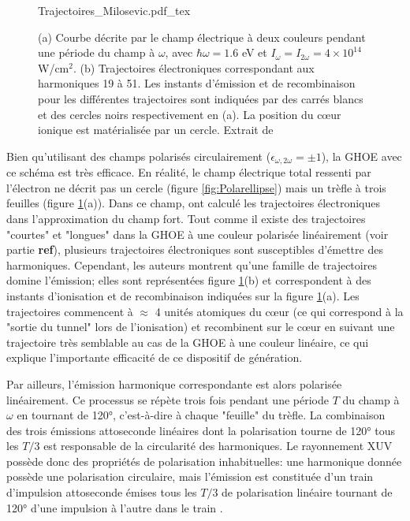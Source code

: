\begin{figure}[ht]
\centering
\def\svgwidth{\textwidth}
{Trajectoires_Milosevic.pdf_tex}
\caption{(a) Courbe décrite par le champ électrique à deux couleurs pendant une période du champ à $\omega$, avec $\hbar \omega = 1.6$ eV et $I_{\omega} = I_{2\omega} = 4 \times 10^{14}$ W/cm$^2$. (b) Trajectoires électroniques correspondant aux harmoniques 19 à 51. Les instants d'émission et de recombinaison pour les différentes trajectoires sont indiquées par des carrés blancs et des cercles noirs respectivement en (a). La position du c\oe ur ionique est matérialisée par un cercle. Extrait de }
\label{fig:Trajectoires_Milosevic}
\end{figure}

Bien qu'utilisant des champs polarisés circulairement ($\epsilon_{\omega, 2\omega} = \pm 1$), la GHOE avec ce schéma est très efficace. En réalité, le champ électrique total ressenti par l'électron ne décrit pas un cercle (figure \ref{fig:Polarellipse}) mais un trèfle à trois feuilles (figure \ref{fig:Trajectoires_Milosevic}(a)). Dans ce champ,  ont calculé les trajectoires électroniques dans l'approximation du champ fort. Tout comme il existe des trajectoires "courtes" et "longues" dans la GHOE à une couleur polarisée linéairement (voir partie \textbf{ref}), plusieurs trajectoires électroniques sont susceptibles d'émettre des harmoniques. Cependant, les auteurs montrent qu'une famille de trajectoires domine l'émission; elles sont représentées figure \ref{fig:Trajectoires_Milosevic}(b) et correspondent à des instants d'ionisation et de recombinaison indiquées sur la figure \ref{fig:Trajectoires_Milosevic}(a). Les trajectoires commencent à $\approx$ 4 unités atomiques du c\oe ur (ce qui correspond à la "sortie du tunnel" lors de l'ionisation) et recombinent sur le c\oe ur en suivant une trajectoire très semblable au cas de la GHOE à une couleur linéaire, ce qui explique l'importante efficacité de ce dispositif de génération. 

Par ailleurs, l'émission harmonique correspondante est alors polarisée linéairement. Ce processus se répète trois fois pendant une période $T$ du champ à $\omega$ en tournant de 120°, c'est-à-dire à chaque "feuille" du trèfle. La combinaison des trois émissions attoseconde linéaires dont la polarisation tourne de 120° tous les $T/3$ est responsable de la circularité des harmoniques. Le rayonnement XUV possède donc des propriétés de polarisation inhabituelles: une harmonique donnée possède une polarisation circulaire, mais l'émission est constituée d'un train d'impulsion attoseconde émises tous les $T/3$ de polarisation linéaire tournant de 120° d'une impulsion à l'autre dans le train .

